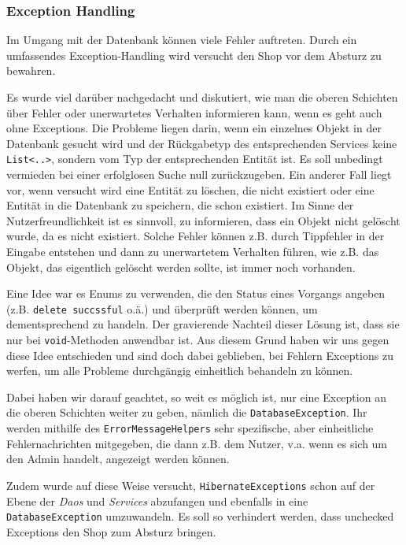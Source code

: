 		\subsubsection{Exception Handling}\label{umsetzung:DB:Exception}
		Im Umgang mit der Datenbank können viele Fehler auftreten. Durch ein umfassendes Exception-Handling wird versucht den Shop vor dem Absturz zu bewahren.
			
		Es wurde viel darüber nachgedacht und diskutiert, wie man die oberen Schichten über Fehler oder unerwartetes Verhalten informieren kann, wenn es geht auch ohne Exceptions. Die Probleme liegen darin, wenn ein einzelnes Objekt in der Datenbank gesucht wird und der Rückgabetyp des entsprechenden Services keine \texttt{List\textless..\textgreater}, sondern vom Typ der entsprechenden Entität ist. Es soll unbedingt vermieden bei einer erfolglosen Suche null zurückzugeben. Ein anderer Fall liegt vor, wenn versucht wird eine Entität zu löschen, die nicht existiert oder eine Entität in die Datenbank zu speichern, die schon existiert. Im Sinne der Nutzerfreundlichkeit ist es sinnvoll, zu informieren, dass ein Objekt nicht gelöscht wurde, da es nicht existiert. Solche Fehler können z.B. durch Tippfehler in der Eingabe entstehen und dann zu unerwartetem Verhalten führen, wie z.B. das Objekt, das eigentlich gelöscht werden sollte, ist immer noch vorhanden.
		
		Eine Idee war es Enums zu verwenden, die den Status eines Vorgangs angeben (z.B. \texttt{delete succssful} o.ä.) und überprüft werden können, um dementsprechend zu handeln. Der gravierende Nachteil dieser Lösung ist, dass sie nur bei \texttt{void}-Methoden anwendbar ist. Aus diesem Grund haben wir uns gegen diese Idee entschieden und sind doch dabei geblieben, bei Fehlern Exceptions zu werfen, um alle Probleme durchgängig einheitlich behandeln zu können.
			
		Dabei haben wir darauf geachtet, so weit es möglich ist, nur eine Exception an die oberen Schichten weiter zu geben, nämlich die \texttt{DatabaseException}. Ihr werden mithilfe des \texttt{ErrorMessageHelpers} sehr spezifische, aber einheitliche Fehlernachrichten mitgegeben, die dann z.B. dem Nutzer, v.a. wenn es sich um den Admin handelt, angezeigt werden können.
		
		Zudem wurde auf diese Weise versucht, \texttt{HibernateExceptions} schon auf der Ebene der \textit{Daos} und \textit{Services} abzufangen und ebenfalls in eine \texttt{DatabaseException} umzuwandeln. Es soll so verhindert werden, dass unchecked Exceptions den Shop zum Absturz bringen.
		
